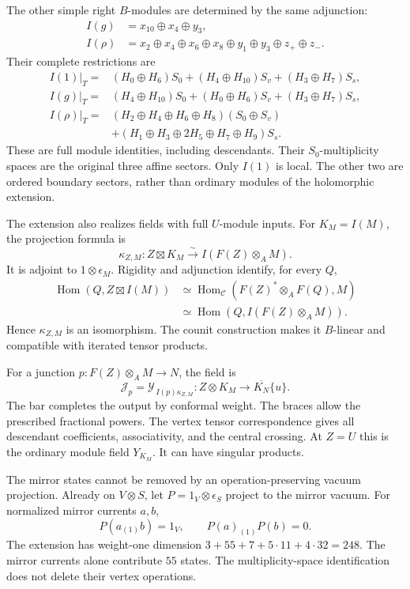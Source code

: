 The other simple right $B$-modules are determined by
the same adjunction:
\[
 \begin{split}
 I(g)&=x_{10}\oplus x_4\oplus y_3,\\
 I(\rho)&=x_2\oplus x_4\oplus x_6\oplus x_8
 \oplus y_1\oplus y_3\oplus z_+\oplus z_-.
 \end{split}
\]
Their complete restrictions are
\[
 \begin{aligned}
 I(1)|_T={}&(H_0\oplus H_6)S_0
 +(H_4\oplus H_{10})S_v+(H_3\oplus H_7)S_s,\\
 I(g)|_T={}&(H_4\oplus H_{10})S_0
 +(H_0\oplus H_6)S_v+(H_3\oplus H_7)S_s,\\
 I(\rho)|_T={}&
 (H_2\oplus H_4\oplus H_6\oplus H_8)(S_0\oplus S_v)\\
 &+(H_1\oplus H_3\oplus2H_5\oplus H_7\oplus H_9)S_s .
 \end{aligned}
\]
These are full module identities, including descendants.
Their $S_0$-multiplicity spaces are the original three
affine sectors. Only $I(1)$ is local.
The other two are ordered boundary sectors, rather than
ordinary modules of the holomorphic extension.

The extension also realizes fields with full $U$-module
inputs. For $K_M=I(M)$, the projection formula is
\[
 \kappa_{Z,M}:Z\boxtimes K_M
 \xrightarrow{\sim}I(F(Z)\otimes_A M).
\]
It is adjoint to $1\otimes\epsilon_M$.
Rigidity and adjunction identify, for every $Q$,
\[
 \begin{split}
 \operatorname{Hom}(Q,Z\boxtimes I(M))
 &\simeq
 \operatorname{Hom}_{\mathcal C}
 (F(Z)^*\otimes_A F(Q),M)\\
 &\simeq
 \operatorname{Hom}(Q,I(F(Z)\otimes_A M)).
 \end{split}
\]
Hence $\kappa_{Z,M}$ is an isomorphism.
The counit construction makes it $B$-linear and compatible
with iterated tensor products.

For a junction $p:F(Z)\otimes_A M\to N$, the field is
\[
 \mathcal J_p=\mathcal Y_{\,I(p)\kappa_{Z,M}}:
 Z\otimes K_M\longrightarrow\overline{K_N}\{u\}.
\]
The bar completes the output by conformal weight.
The braces allow the prescribed fractional powers.
The vertex tensor correspondence gives all descendant
coefficients, associativity, and the central crossing.
At $Z=U$ this is the ordinary module field $Y_{K_M}$.
It can have singular products.

The mirror states cannot be removed by an operation-preserving
vacuum projection. Already on $V\otimes S$, let
$P=1_V\otimes\epsilon_S$ project to the mirror vacuum.
For normalized mirror currents $a,b$,
\[
 P(a_{(1)}b)=1_V,\qquad P(a)_{(1)}P(b)=0.
\]
The extension has weight-one dimension
$3+55+7+5\cdot11+4\cdot32=248$. The mirror currents alone
contribute $55$ states. The multiplicity-space identification
does not delete their vertex operations.

